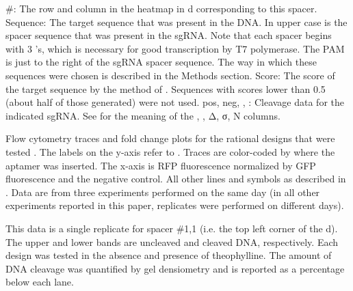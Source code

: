 \documentclass[10pt,oneside]{article}
\begin{document}


    \#: The row and column in the heatmap in d corresponding to this spacer.
    Sequence: The  target sequence that was present in the DNA.  In upper case is the  spacer sequence that was present in the sgRNA.  Note that each spacer begins with 3 's, which is necessary for good transcription by T7 polymerase.  The  PAM is just to the right of the sgRNA spacer sequence.  The way in which these sequences were chosen is described in the Methods section.
    Score: The score of the target sequence by the method of .  Sequences with scores lower than 0.5 (about half of those generated) were not used.
    pos, neg, \ligrnaF{}, \ligrnaB{}: Cleavage data for the indicated sgRNA.  See  for the meaning of the \apo{}, \holo{}, Δ, σ, N columns.



      Flow cytometry traces and fold change plots for the rational designs that were tested \invivo{}.  The labels on the y-axis refer to .  Traces are color-coded by where the aptamer was inserted.  The x-axis is RFP fluorescence normalized by GFP fluorescence and the negative control.  All other lines and symbols as described in .  Data are from three experiments performed on the same day (in all other experiments reported in this paper, replicates were performed on different days).



      This data is a single replicate for spacer \#1,1 (i.e. the top left corner of the d).  The upper and lower bands are uncleaved and cleaved DNA, respectively.  Each design was tested in the absence and presence of theophylline.  The amount of DNA cleavage was quantified by gel densiometry and is reported as a percentage below each lane.


\end{document}
